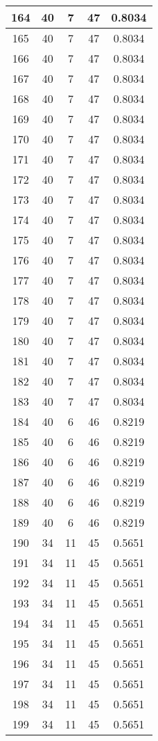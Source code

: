 \documentclass[letterpaper, 12pt]{article}
\begin{document}
\begin{longtable}{|c|c|c|c|c|}
\hline
164 & 40 & 7 & 47 & 0.8034 \\
\hline
165 & 40 & 7 & 47 & 0.8034 \\
\hline
166 & 40 & 7 & 47 & 0.8034 \\
\hline
167 & 40 & 7 & 47 & 0.8034 \\
\hline
168 & 40 & 7 & 47 & 0.8034 \\
\hline
169 & 40 & 7 & 47 & 0.8034 \\
\hline
170 & 40 & 7 & 47 & 0.8034 \\
\hline
171 & 40 & 7 & 47 & 0.8034 \\
\hline
172 & 40 & 7 & 47 & 0.8034 \\
\hline
173 & 40 & 7 & 47 & 0.8034 \\
\hline
174 & 40 & 7 & 47 & 0.8034 \\
\hline
175 & 40 & 7 & 47 & 0.8034 \\
\hline
176 & 40 & 7 & 47 & 0.8034 \\
\hline
177 & 40 & 7 & 47 & 0.8034 \\
\hline
178 & 40 & 7 & 47 & 0.8034 \\
\hline
179 & 40 & 7 & 47 & 0.8034 \\
\hline
180 & 40 & 7 & 47 & 0.8034 \\
\hline
181 & 40 & 7 & 47 & 0.8034 \\
\hline
182 & 40 & 7 & 47 & 0.8034 \\
\hline
183 & 40 & 7 & 47 & 0.8034 \\
\hline
184 & 40 & 6 & 46 & 0.8219 \\
\hline
185 & 40 & 6 & 46 & 0.8219 \\
\hline
186 & 40 & 6 & 46 & 0.8219 \\
\hline
187 & 40 & 6 & 46 & 0.8219 \\
\hline
188 & 40 & 6 & 46 & 0.8219 \\
\hline
189 & 40 & 6 & 46 & 0.8219 \\
\hline
190 & 34 & 11 & 45 & 0.5651 \\
\hline
191 & 34 & 11 & 45 & 0.5651 \\
\hline
192 & 34 & 11 & 45 & 0.5651 \\
\hline
193 & 34 & 11 & 45 & 0.5651 \\
\hline
194 & 34 & 11 & 45 & 0.5651 \\
\hline
195 & 34 & 11 & 45 & 0.5651 \\
\hline
196 & 34 & 11 & 45 & 0.5651 \\
\hline
197 & 34 & 11 & 45 & 0.5651 \\
\hline
198 & 34 & 11 & 45 & 0.5651 \\
\hline
199 & 34 & 11 & 45 & 0.5651 \\
\hline
\end{longtable}
\end{document}
